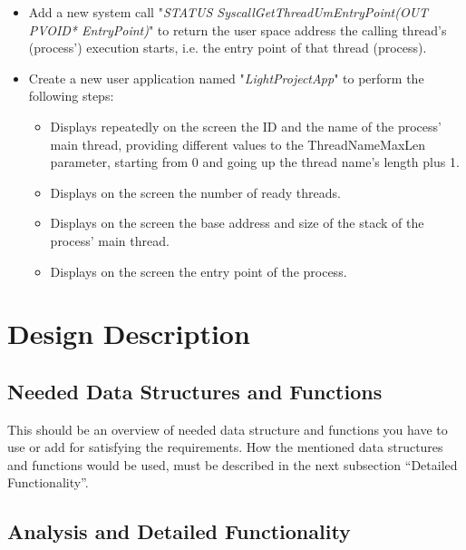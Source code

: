 \begin{itemize}
    \item Add a new system call "\textit{STATUS SyscallGetThreadUmEntryPoint(OUT PVOID* EntryPoint)}" to return the user space address the calling thread's (process') execution starts, i.e. the entry point of that thread (process).

    \item Create a new user application named "\textit{LightProjectApp}" to perform the following steps:
        \begin{itemize}
            \item Displays repeatedly on the screen the ID and the name of the process' main thread, providing different values to the ThreadNameMaxLen parameter, starting from 0 and going up the thread name's length plus 1. 
            
            \item Displays on the screen the number of  ready threads.

            \item Displays on the screen the base address and size of the stack of the process' main thread.

            \item Displays on the screen the entry point of the process. 
        \end{itemize}

\end{itemize}


\section{Design Description}

\subsection{Needed Data Structures and Functions}

This should be an overview of needed data structure and functions you have to use or add for satisfying the requirements. How the mentioned data structures and functions would be used, must be described in the next subsection ``Detailed Functionality''.


\subsection{Analysis and Detailed Functionality}

